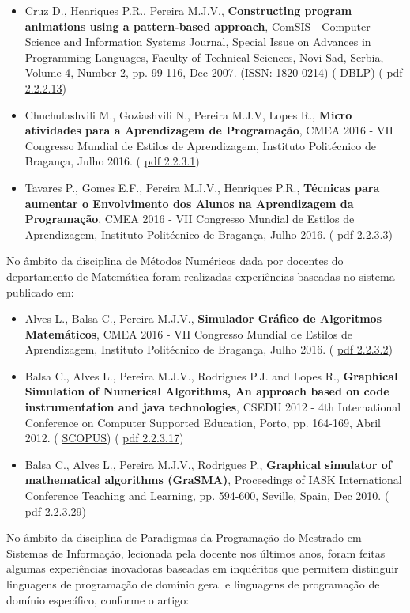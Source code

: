 \documentclass[11pt]{article}
\begin{document}
\begin{itemize}
\item{Cruz D., Henriques P.R., Pereira M.J.V., {
\bf{ Constructing program animations using a pattern-based approach}}, ComSIS - Computer Science and Information Systems Journal, Special Issue on Advances in Programming Languages, Faculty of Technical Sciences, Novi Sad, Serbia, Volume 4, Number 2, pp. 99-116, Dec 2007. (ISSN: 1820-0214) (
\href{run:Publicacoes/ComprovativosDBLP.pdf}{DBLP}) (
\href{run:Publicacoes/publicacoes/25.pdf}{pdf 2.2.2.13})}
\item{Chuchulashvili M., Goziashvili N., Pereira M.J.V, Lopes R., {
\bf{ Micro atividades para a Aprendizagem de Programação}}, CMEA 2016 - VII Congresso Mundial de Estilos de Aprendizagem, Instituto Politécnico de Bragança, Julho 2016. (
\href{run:Publicacoes/publicacoes/91.pdf}{pdf 2.2.3.1})}
\item{Tavares P., Gomes E.F., Pereira M.J.V., Henriques P.R., {
\bf{ Técnicas para aumentar o Envolvimento dos Alunos na Aprendizagem da Programação}}, CMEA 2016 - VII Congresso Mundial de Estilos de Aprendizagem, Instituto Politécnico de Bragança, Julho 2016. (
\href{run:Publicacoes/publicacoes/89.pdf}{pdf 2.2.3.3})}
\end{itemize}No âmbito da disciplina de Métodos Numéricos dada por docentes do departamento de Matemática foram realizadas experiências baseadas no sistema publicado em:
\begin{itemize}
\item{Alves L., Balsa C., Pereira M.J.V., {
\bf{ Simulador Gráfico de Algoritmos Matemáticos}}, CMEA 2016 - VII Congresso Mundial de Estilos de Aprendizagem, Instituto Politécnico de Bragança, Julho 2016. (
\href{run:Publicacoes/publicacoes/90.pdf}{pdf 2.2.3.2})}
\item{Balsa C., Alves L., Pereira M.J.V., Rodrigues P.J. and Lopes R., {
\bf{ Graphical Simulation of Numerical Algorithms, An approach based on code instrumentation and java technologies}}, CSEDU 2012 - 4th International Conference on Computer Supported Education, Porto, pp. 164-169, Abril 2012. (
\href{run:Publicacoes/PublicacoesSCOPUS.pdf}{SCOPUS}) (
\href{run:Publicacoes/publicacoes/66.pdf}{pdf 2.2.3.17})}
\item{Balsa C., Alves L., Pereira M.J.V., Rodrigues P., {
\bf{ Graphical simulator of mathematical algorithms (GraSMA)}}, Proceedings of IASK International Conference Teaching and Learning, pp. 594-600, Seville, Spain, Dec 2010. (
\href{run:Publicacoes/publicacoes/84.pdf}{pdf 2.2.3.29})}
\end{itemize}No âmbito da disciplina de Paradigmas da Programação do Mestrado em Sistemas de Informação, lecionada pela docente nos últimos anos, foram feitas algumas experiências inovadoras baseadas em inquéritos que permitem distinguir linguagens de programação de domínio geral e linguagens de programação de domínio específico, conforme o artigo:
\end{document}

